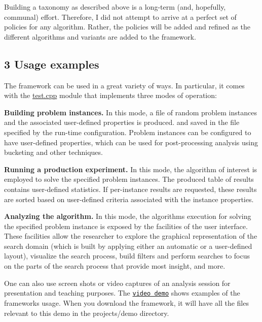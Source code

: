Building a taxonomy as described above is a long-\/term (and, hopefully, communal) effort. Therefore, I did not attempt to arrive at a perfect set of policies for any algorithm. Rather, the policies will be added and refined as the different algorithms and variants are added to the framework.\hypertarget{index_s-examples}{}\subsection{3 Usage examples}\label{index_s-examples}
The framework can be used in a great variety of ways. In particular, it comes with the \hyperlink{test_8cpp}{test.\+cpp} module that implements three modes of operation\+:
\begin{DoxyItemize}
\item {\bfseries Building problem instances.} In this mode, a file of random problem instances and the associated user-\/defined properties is produced. and saved in the file specified by the run-\/time configuration. Problem instances can be configured to have user-\/defined properties, which can be used for post-\/processing analysis using bucketing and other techniques.
\item {\bfseries Running a production experiment.} In this mode, the algorithm of interest is employed to solve the specified problem instances. The produced table of results contains user-\/defined statistics. If per-\/instance results are requested, these results are sorted based on user-\/defined criteria associated with the instance properties.
\item {\bfseries Analyzing the algorithm.} In this mode, the algorithm\textquotesingle{}s execution for solving the specified problem instance is exposed by the facilities of the user interface. These facilities allow the researcher to explore the graphical representation of the search domain (which is built by applying either an automatic or a user-\/defined layout), visualize the search process, build filters and perform searches to focus on the parts of the search process that provide most insight, and more.
\end{DoxyItemize}

One can also use screen shots or video captures of an analysis session for presentation and teaching purposes. The \href{https://youtu.be/cElxLWve1Zw}{\tt video demo} shows examples of the framework\textquotesingle{}s usage. When you download the framework, it will have all the files relevant to this demo in the {\ttfamily projects/demo directory}.

